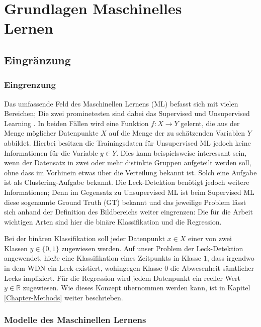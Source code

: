 \chapter{Grundlagen Maschinelles \\ Lernen \label{Chapter-ML}}

\section{Eingränzung}

\subsection*{Eingrenzung}

Das umfassende Feld des Maschinellen Lernens (ML) befasst sich mit vielen Bereichen;
 Die zwei prominetesten sind dabei das Supervised und Unsupervised Learning \cite{mlTheory}.
 In beiden Fällen wird eine Funktion $f: X \rightarrow Y$ gelernt, die aus der Menge möglicher Datenpunkte $X$ auf
 die Menge der zu schätzenden Variablen $Y$ abbildet. Hierbei besitzen die Trainingsdaten für Unsupervised ML
 jedoch keine Informationen für die Variable $y \in Y$. Dies kann beispielsweise interessant sein, wenn der
 Datensatz in zwei oder mehr distinkte Gruppen aufgeteilt werden soll, ohne dass im Vorhinein etwas über die
 Verteilung bekannt ist. Solch eine Aufgabe ist als Clustering-Aufgabe bekannt. Die Leck-Detektion benötigt jedoch
 weitere Informationen; Denn im Gegensatz zu Unsupervised ML ist beim Supervised ML diese sogenannte Ground Truth
 (GT) bekannt und das jeweilige Problem lässt sich anhand der Definition des Bildbereichs weiter eingrenzen: Die
 für die Arbeit wichtigen Arten sind hier die binäre Klassifikation und die Regression.

Bei der binären Klassifikation soll jeder Datenpunkt $x \in X$ einer von zwei Klassen $y \in \{0, 1\}$ zugewiesen
 werden. Auf unser Problem der Leck-Detektion angewendet, hieße eine Klassifikation eines Zeitpunkts in
 Klasse $1$, dass irgendwo in dem WDN ein Leck existiert, wohingegen Klasse $0$ die Abwesenheit sämtlicher
 Lecks impliziert. Für die Regression wird jedem Datenpunkt ein reeller Wert $y \in \mathbb{R}$ zugewiesen.
 Wie dieses Konzept übernommen werden kann, ist in Kapitel \ref{Chapter-Methods} weiter beschrieben. 


\subsection*{Modelle des Maschinellen Lernens}

